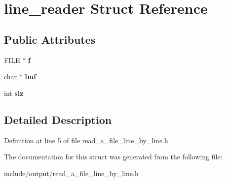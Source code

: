 \hypertarget{structline__reader}{\section{line\-\_\-reader Struct Reference}
\label{structline__reader}
}
\subsection*{Public Attributes}
\begin{DoxyCompactItemize}
\item 
\hypertarget{structline__reader_a39e7dce5717081ae43caf917d3f2940b}{F\-I\-L\-E $\ast$ {\bfseries f}}\label{structline__reader_a39e7dce5717081ae43caf917d3f2940b}

\item 
\hypertarget{structline__reader_af1f108355e7b9f7e0b54874206fa5408}{char $\ast$ {\bfseries buf}}\label{structline__reader_af1f108355e7b9f7e0b54874206fa5408}

\item 
\hypertarget{structline__reader_a718acbca0fbe3a403b2ca2d4a1f1da12}{int {\bfseries siz}}\label{structline__reader_a718acbca0fbe3a403b2ca2d4a1f1da12}

\end{DoxyCompactItemize}


\subsection{Detailed Description}


Definition at line 5 of file read\-\_\-a\-\_\-file\-\_\-line\-\_\-by\-\_\-line.\-h.



The documentation for this struct was generated from the following file\-:\begin{DoxyCompactItemize}
\item 
include/output/read\-\_\-a\-\_\-file\-\_\-line\-\_\-by\-\_\-line.\-h\end{DoxyCompactItemize}
